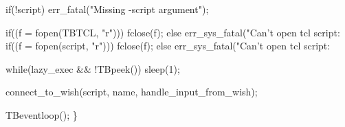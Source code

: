   if(!script)
    err_fatal("Missing -script argument");

  if((f = fopen(TBTCL, "r")))
    fclose(f);
  else
    err_sys_fatal("Can't open tcl script: %
  if((f = fopen(script, "r")))
    fclose(f);
  else
    err_sys_fatal("Can't open tcl script: %
    
  while(lazy_exec && !TBpeek())
    sleep(1);

  connect_to_wish(script, name, handle_input_from_wish);

  TBeventloop();
\}
\nwendcode{}

%
\nwdocspar
\nwenddocs{}
